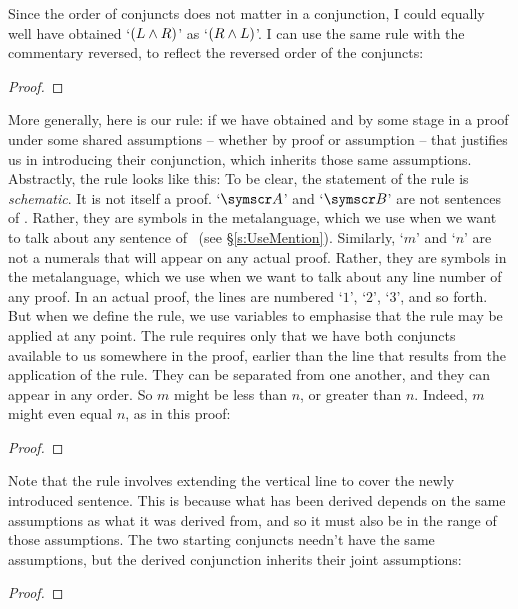 Since the order of conjuncts does not matter in a conjunction, I could equally well have obtained `$(L \wedge R)$' as `$(R \wedge L)$'. I can use the same rule with the commentary reversed, to reflect the reversed order of the conjuncts:
\begin{proof}
	 
\end{proof}
 More generally, here is our  rule: if we have obtained  and  by some stage in a proof under some shared assumptions – whether by proof or assumption – that justifies us in introducing their conjunction, which inherits those same assumptions.  Abstractly, the rule looks like this:
To be clear, the statement of the rule is \emph{schematic}. It is not itself a proof. `$\meta{A}$' and `$\meta{B}$' are not sentences of \TFL. Rather, they are symbols in the metalanguage, which we use when we want to talk about any sentence of \TFL\ (see §\ref{s:UseMention}). Similarly, `$m$' and `$n$' are not a numerals that will appear on any actual proof. Rather, they are symbols in the metalanguage, which we use when we want to talk about any line number of any proof. In an actual proof, the lines are numbered `$1$', `$2$', `$3$', and so forth. But when we define the rule, we use variables to emphasise that the rule may be applied at any point. The rule requires only that we have both conjuncts available to us somewhere in the proof, earlier than the line that results from the application of the rule. They can be separated from one another, and they can appear in any order. So $m$ might be less than $n$, or greater than $n$. Indeed, $m$ might even equal $n$, as in this proof:
\begin{proof}
	 
\end{proof}

Note that the rule involves extending the vertical line to cover the newly introduced sentence. This is because what has been derived depends on the same assumptions as what it was derived from, and so it must also be in the range of those assumptions.  The two starting conjuncts needn't have the same assumptions, but the derived conjunction inherits their joint assumptions: 
\begin{proof}
	\open
	 
\end{proof}

